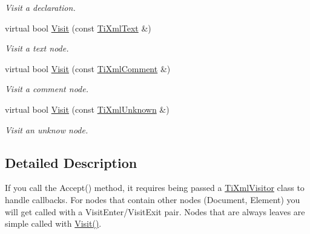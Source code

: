\begin{DoxyCompactItemize}
\begin{DoxyCompactList}\small\item\em Visit a declaration. \item\end{DoxyCompactList}\item 
\hypertarget{class_ti_xml_visitor_a399b8ebca5cd14664974a32d2ce029e5}{
virtual bool \hyperlink{class_ti_xml_visitor_a399b8ebca5cd14664974a32d2ce029e5}{Visit} (const \hyperlink{class_ti_xml_text}{TiXmlText} \&)}
\label{class_ti_xml_visitor_a399b8ebca5cd14664974a32d2ce029e5}

\begin{DoxyCompactList}\small\item\em Visit a text node. \item\end{DoxyCompactList}\item 
\hypertarget{class_ti_xml_visitor_a53a60e7a528627b31af3161972cc7fa2}{
virtual bool \hyperlink{class_ti_xml_visitor_a53a60e7a528627b31af3161972cc7fa2}{Visit} (const \hyperlink{class_ti_xml_comment}{TiXmlComment} \&)}
\label{class_ti_xml_visitor_a53a60e7a528627b31af3161972cc7fa2}

\begin{DoxyCompactList}\small\item\em Visit a comment node. \item\end{DoxyCompactList}\item 
\hypertarget{class_ti_xml_visitor_a7e284d607d275c51dac1adb58159ce28}{
virtual bool \hyperlink{class_ti_xml_visitor_a7e284d607d275c51dac1adb58159ce28}{Visit} (const \hyperlink{class_ti_xml_unknown}{TiXmlUnknown} \&)}
\label{class_ti_xml_visitor_a7e284d607d275c51dac1adb58159ce28}

\begin{DoxyCompactList}\small\item\em Visit an unknow node. \item\end{DoxyCompactList}\end{DoxyCompactItemize}


\subsection{Detailed Description}
If you call the Accept() method, it requires being passed a \hyperlink{class_ti_xml_visitor}{TiXmlVisitor} class to handle callbacks. For nodes that contain other nodes (Document, Element) you will get called with a VisitEnter/VisitExit pair. Nodes that are always leaves are simple called with \hyperlink{class_ti_xml_visitor_afad71c71ce6473fb9b4b64cd92de4a19}{Visit()}.

